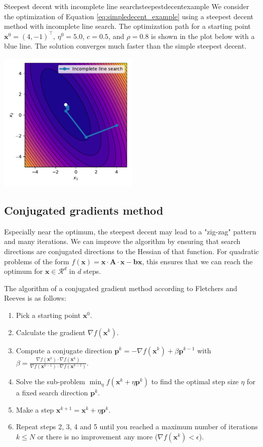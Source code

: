 \begin{example}{Steepest decent with incomplete line search}{steepestdecentexample}
    We consider the optimization of Equation \eqref{eq:simpledecent_example} using a steepest decent method with incomplete line search. The optimization path for a starting point $\mathbf{x}^0= (4, -1)^\top$, $\eta^0=5.0$, $c=0.5$, and $\rho=0.8$ is shown in the plot below with a blue line. The solution converges much faster than the simple steepest decent.
    \begin{center}
        \includegraphics[width=0.5\textwidth]{figures/steepest_decent.pdf}
    \end{center}   
\end{example}

\subsection{Conjugated gradients method}
Especially near the optimum, the steepest decent may lead to a "zig-zag" pattern and many iterations. We can improve the algorithm by ensuring that search directions are conjugated directions to the Hessian of that function. For quadratic problems of the form $f(\mathbf{x}) = \mathbf{x} \cdot \mathbf{A} \cdot \mathbf{x} - \mathbf{b} \mathbf{x}$, this ensures that we can reach the optimum for $\mathbf{x} \in \mathcal{R}^d$ in $d$ steps.

The algorithm of a conjugated gradient method according to Fletchers and Reeves \cite{Fletcher1964} is as follows: 
\begin{enumerate}
    \item Pick a starting point $\mathbf{x}^0$.
    \item Calculate the gradient $\nabla f(\mathbf{x}^k)$.
    \item Compute a conjugate direction $\mathbf{p}^k = -\nabla f(\mathbf{x}^k) + \beta \mathbf{p}^{k-1}$ with $\beta = \frac{\nabla f(\mathbf{x}^k) \cdot \nabla f(\mathbf{x}^k)}{\nabla f(\mathbf{x}^{k-1}) \cdot \nabla f(\mathbf{x}^{k-1})}$.
    \item Solve the sub-problem $\min_{\eta} f(\mathbf{x}^k + \eta \mathbf{p}^k)$ to find the optimal step size $\eta$ for a fixed search direction $\mathbf{p}^k$.
    \item Make a step $\mathbf{x}^{k+1} = \mathbf{x}^k + \eta \mathbf{p}^k$.
    \item Repeat steps 2, 3, 4 and 5 until you reached a maximum number of iterations $k \le N$ or there is no improvement any more ($ \nabla f(\mathbf{x}^k) < \epsilon$). 
\end{enumerate}

